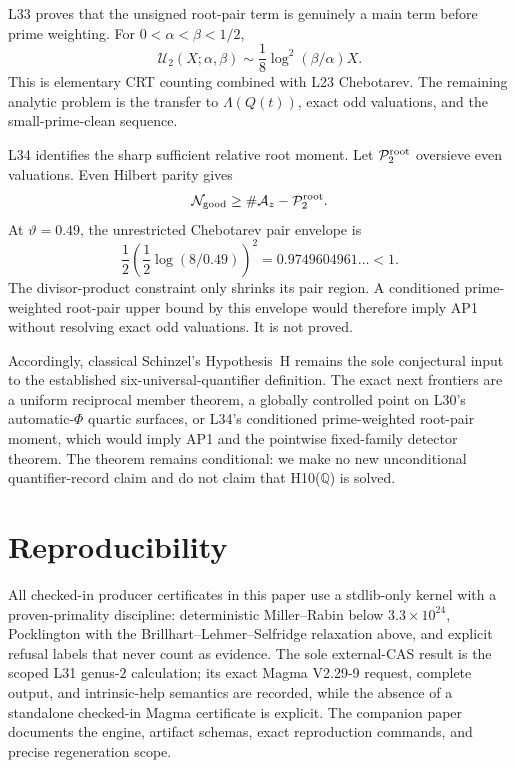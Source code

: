 \documentclass[11pt]{amsart}
\theoremstyle{definition}
\theoremstyle{remark}
\newcommand{\Q}{\mathbb{Q}}
\begin{document}
L33 proves that the unsigned root-pair term is genuinely a main term
before prime weighting.  For \(0<\alpha<\beta<1/2\),
\[
\mathcal U_2(X;\alpha,\beta)
\sim\frac18\log^2(\beta/\alpha)X.
\]
This is elementary CRT counting combined with L23 Chebotarev.  The
remaining analytic problem is the transfer to
\(\Lambda(Q(t))\), exact odd valuations, and the small-prime-clean
sequence.

L34 identifies the sharp sufficient relative root moment.  Let
\(\mathcal P_2^{\rm root}\) oversieve even valuations.  Even Hilbert
parity gives
\[
\mathcal N_{\rm good}
\ge\#\mathcal A_z-\mathcal P_2^{\rm root}.
\]
At \(\vartheta=0.49\), the unrestricted Chebotarev pair envelope is
\[
\frac12\left(\frac12\log(8/0.49)\right)^2
=0.9749604961\ldots<1.
\]
The divisor-product constraint only shrinks its pair region.  A
conditioned prime-weighted root-pair upper bound by this envelope would
therefore imply AP1 without resolving exact odd valuations.  It is not
proved.

Accordingly, classical Schinzel's Hypothesis~H remains the sole
conjectural input to the established six-universal-quantifier definition.
The exact next frontiers are a uniform reciprocal member theorem, a
globally controlled point on L30's automatic-\(\Phi\) quartic surfaces,
or L34's conditioned prime-weighted root-pair moment, which would
imply AP1 and the pointwise fixed-family detector theorem.  The
theorem remains conditional: we make no new unconditional
quantifier-record claim and do not claim that H10(\(\Q\)) is solved.

\section*{Reproducibility}

All checked-in producer certificates in this paper use a stdlib-only
kernel with a proven-primality discipline: deterministic Miller--Rabin
below \(3.3\times10^{24}\), Pocklington with the
Brillhart--Lehmer--Selfridge relaxation above, and explicit refusal
labels that never count as evidence.  The sole external-CAS result is
the scoped L31 genus-\(2\) calculation; its exact Magma V2.29-9 request,
complete output, and intrinsic-help semantics are recorded, while the
absence of a standalone checked-in Magma certificate is explicit.  The
companion paper documents the engine, artifact schemas, exact
reproduction commands, and precise regeneration scope.
\end{document}
